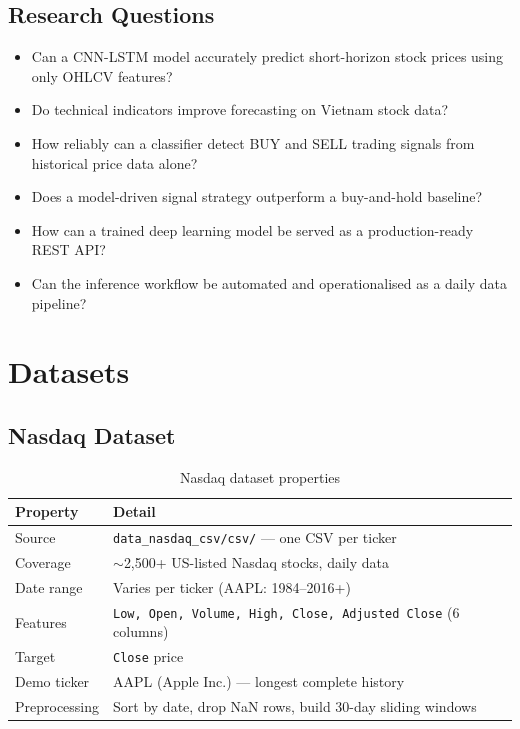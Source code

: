 \documentclass[12pt,a4paper]{article}
\begin{document}
\subsection{Research Questions}

\begin{itemize}[leftmargin=2em]
  \item Can a CNN-LSTM model accurately predict short-horizon stock prices using
        only OHLCV features?
  \item Do technical indicators improve forecasting on Vietnam stock data?
  \item How reliably can a classifier detect BUY and SELL trading signals from
        historical price data alone?
  \item Does a model-driven signal strategy outperform a buy-and-hold baseline?
  \item How can a trained deep learning model be served as a production-ready
        REST API?
  \item Can the inference workflow be automated and operationalised as a daily
        data pipeline?
\end{itemize}

\section{Datasets}

\subsection{Nasdaq Dataset}

\begin{table}[H]
\centering
\caption{Nasdaq dataset properties}
\begin{tabularx}{\linewidth}{lX}
\toprule
\textbf{Property} & \textbf{Detail} \\
\midrule
Source       & \texttt{data\_nasdaq\_csv/csv/} --- one CSV per ticker \\
Coverage     & $\sim$2,500+ US-listed Nasdaq stocks, daily data \\
Date range   & Varies per ticker (AAPL: 1984--2016+) \\
Features     & \texttt{Low, Open, Volume, High, Close, Adjusted Close} (6 columns) \\
Target       & \texttt{Close} price \\
Demo ticker  & AAPL (Apple Inc.) --- longest complete history \\
Preprocessing& Sort by date, drop NaN rows, build 30-day sliding windows \\
\bottomrule
\end{tabularx}
\end{table}
\end{document}
